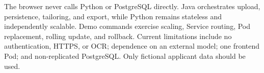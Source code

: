 \documentclass[10pt,a4paper]{article}
\begin{document}
The browser never calls Python or PostgreSQL directly. Java orchestrates upload, persistence, tailoring, and export, while Python remains stateless and independently scalable. Demo commands exercise scaling, Service routing, Pod replacement, rolling update, and rollback. Current limitations include no authentication, HTTPS, or OCR; dependence on an external model; one frontend Pod; and non-replicated PostgreSQL. Only fictional applicant data should be used.
\end{document}
